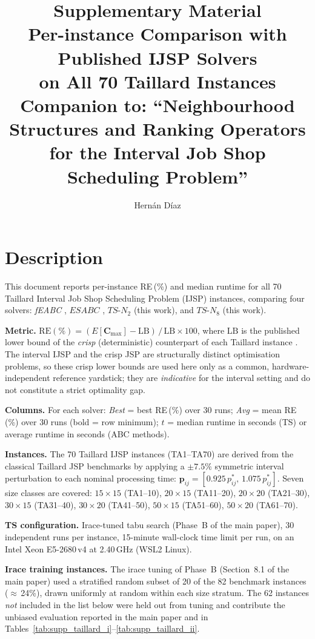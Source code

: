 \documentclass[a4paper,11pt]{article}
\title{\textbf{Supplementary Material}\\[6pt]
Per-instance Comparison with Published IJSP Solvers\\
on All 70 Taillard Instances\\[6pt]
{\normalsize Companion to: ``Neighbourhood Structures and Ranking Operators\\
for the Interval Job Shop Scheduling Problem''}}
\author{Hern\'an D\'iaz}
\date{}
\begin{document}
\maketitle
\thispagestyle{empty}

\section*{Description}

This document reports per-instance RE\,(\%) and median runtime for all 70 Taillard
Interval Job Shop Scheduling Problem (IJSP) instances, comparing four solvers:
\emph{fEABC} \cite{DiazFEABC2023}, $ESABC$ \cite{DiazICAE2023},
$TS\text{-}N_2$ (this work), and $TS\text{-}N_8$ (this work).

\medskip\noindent
\textbf{Metric.}
$\mathrm{RE}(\%) = (E[\mathbf{C}_{\max}] - \mathrm{LB})\,/\,\mathrm{LB} \times 100$,
where $\mathrm{LB}$ is the published lower bound of the \emph{crisp} (deterministic)
counterpart of each Taillard instance \cite{Taillard1993}. The interval IJSP and
the crisp JSP are structurally distinct optimisation problems, so these crisp
lower bounds are used here only as a common, hardware-independent reference
yardstick; they are \emph{indicative} for the interval setting and do not
constitute a strict optimality gap.

\medskip\noindent
\textbf{Columns.} For each solver: \emph{Best} = best RE\,(\%) over 30 runs;
\emph{Avg} = mean RE\,(\%) over 30 runs (bold = row minimum);
$t$ = median runtime in seconds (TS) or average runtime in seconds (ABC methods).

\medskip\noindent
\textbf{Instances.} The 70 Taillard IJSP instances (TA1--TA70) are derived from
the classical Taillard JSP benchmarks \cite{Taillard1993} by applying a
$\pm7.5\%$ symmetric interval perturbation to each nominal processing time:
$\mathbf{p}_{ij} = [0.925\,p_{ij}^{*},\, 1.075\,p_{ij}^{*}]$.
Seven size classes are covered: $15{\times}15$ (TA1--10),
$20{\times}15$ (TA11--20), $20{\times}20$ (TA21--30),
$30{\times}15$ (TA31--40), $30{\times}20$ (TA41--50),
$50{\times}15$ (TA51--60), $50{\times}20$ (TA61--70).

\medskip\noindent
\textbf{TS configuration.} Irace-tuned tabu search (Phase~B of the main paper),
30 independent runs per instance, 15-minute wall-clock time limit per run,
on an Intel Xeon E5-2680\,v4 at 2.40\,GHz (WSL2 Linux).

\medskip\noindent
\textbf{Irace training instances.} The irace tuning of Phase~B (Section~8.1
of the main paper) used a stratified random subset of 20 of the 82 benchmark
instances ($\approx$\,24\%), drawn uniformly at random within each size
stratum. The 62 instances \emph{not} included in the list below were held
out from tuning and contribute the unbiased evaluation reported in the
main paper and in Tables~\ref{tab:supp_taillard_i}--\ref{tab:supp_taillard_ii}.
\end{document}
